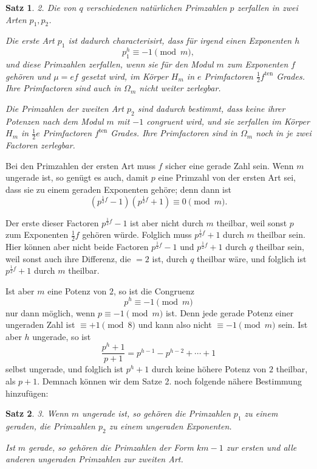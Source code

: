 \documentclass[12pt,a4paper]{article}
\newtheorem*{satz}{Satz}
\begin{document}
\begin{satz}
2. Die von $q$ verschiedenen natürlichen Primzahlen $p$ zerfallen in zwei Arten $p_1, p_2$.

Die erste Art $p_1$ ist dadurch characterisirt, dass für irgend einen Exponenten $h$
\[
p_1^h \equiv -1 \pmod{m},
\]
und diese Primzahlen zerfallen, wenn sie für den Modul $m$ zum Exponenten $f$ gehören und $\mu = ef$ gesetzt wird, im Körper $H_m$ in $e$ Primfactoren $\frac{1}{2}f^{\text{ten}}$ Grades. Ihre Primfactoren sind auch in $\Omega_m$ nicht weiter zerlegbar.

Die Primzahlen der zweiten Art $p_2$ sind dadurch bestimmt, dass keine ihrer Potenzen nach dem Modul $m$ mit $-1$ congruent wird, und sie zerfallen im Körper $H_m$ in $\frac{1}{2}e$ Primfactoren $f^{\text{ten}}$ Grades. Ihre Primfactoren sind in $\Omega_m$ noch in je zwei Factoren zerlegbar.
\end{satz}

Bei den Primzahlen der ersten Art muss $f$ sicher eine gerade Zahl sein. Wenn $m$ ungerade ist, so genügt es auch, damit $p$ eine Primzahl von der ersten Art sei, dass sie zu einem geraden Exponenten gehöre; denn dann ist
\[
(p^{\frac{1}{2}f} - 1)(p^{\frac{1}{2}f} + 1) \equiv 0 \pmod{m}.
\]

Der erste dieser Factoren $p^{\frac{1}{2}f} - 1$ ist aber nicht durch $m$ theilbar, weil sonst $p$ zum Exponenten $\frac{1}{2}f$ gehören würde. Folglich muss $p^{\frac{1}{2}f} + 1$ durch $m$ theilbar sein. Hier können aber nicht beide Factoren $p^{\frac{1}{2}f} - 1$ und $p^{\frac{1}{2}f} + 1$ durch $q$ theilbar sein, weil sonst auch ihre Differenz, die $= 2$ ist, durch $q$ theilbar wäre, und folglich ist $p^{\frac{1}{2}f} + 1$ durch $m$ theilbar.

Ist aber $m$ eine Potenz von $2$, so ist die Congruenz
\[
p^h \equiv -1 \pmod{m}
\]
nur dann möglich, wenn $p \equiv -1 \pmod{m}$ ist. Denn jede gerade Potenz einer ungeraden Zahl ist $\equiv +1 \pmod{8}$ und kann also nicht $\equiv -1 \pmod{m}$ sein. Ist aber $h$ ungerade, so ist
\[
\frac{p^h + 1}{p + 1} = p^{h-1} - p^{h-2} + \cdots + 1
\]
selbst ungerade, und folglich ist $p^h + 1$ durch keine höhere Potenz von $2$ theilbar, als $p + 1$. Demnach können wir dem Satze 2. noch folgende nähere Bestimmung hinzufügen:

\begin{satz}
3. Wenn $m$ ungerade ist, so gehören die Primzahlen $p_1$ zu einem geraden, die Primzahlen $p_2$ zu einem ungeraden Exponenten.

Ist $m$ gerade, so gehören die Primzahlen der Form $km - 1$ zur ersten und alle anderen ungeraden Primzahlen zur zweiten Art.
\end{satz}
\end{document}
